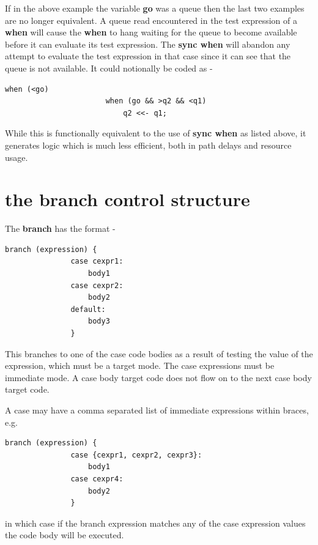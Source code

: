            If in the above example the variable {\bf go} was a queue then the last
            two examples are no longer equivalent. A queue read encountered in the
            test expression of a {\bf when} will cause the {\bf when} to hang
            waiting for the queue to become available before it can evaluate its
            test expression. The {\bf sync when} will abandon any attempt to evaluate the
            test expression in that case since it can see that the queue is not
            available. It could notionally be coded as -
            \begin{lstlisting}[gobble=12, language=threepl]
                   when (<go)
                       when (go && >q2 && <q1)
                           q2 <<- q1;
            \end{lstlisting}
            While this is functionally equivalent to the use of {\bf sync when} as
            listed above, it generates logic which is much less efficient, both
            in path delays and resource usage.





    \section{the {\bf branch} control structure}\label{sec:branch_struct}
    
        The {\bf branch} has the format -
        \begin{lstlisting}[gobble=8, language=threepl]
               branch (expression) {
               case cexpr1:
                   body1
               case cexpr2:
                   body2
               default:
                   body3
               }
        \end{lstlisting}
        
        This branches to one of the case code bodies as a result of testing
        the value of the expression, which must be a target mode. The case
        expressions must be immediate mode. A case body target code does not flow
        on to the next case body target code.
        
        A case may have a comma separated list of immediate expressions
        within braces, e.g.
        \begin{lstlisting}[gobble=8, language=threepl]
               branch (expression) {
               case {cexpr1, cexpr2, cexpr3}:
                   body1
               case cexpr4:
                   body2
               }
        \end{lstlisting}
        in which case if the branch expression matches any of the case
        expression values the code body will be executed.

